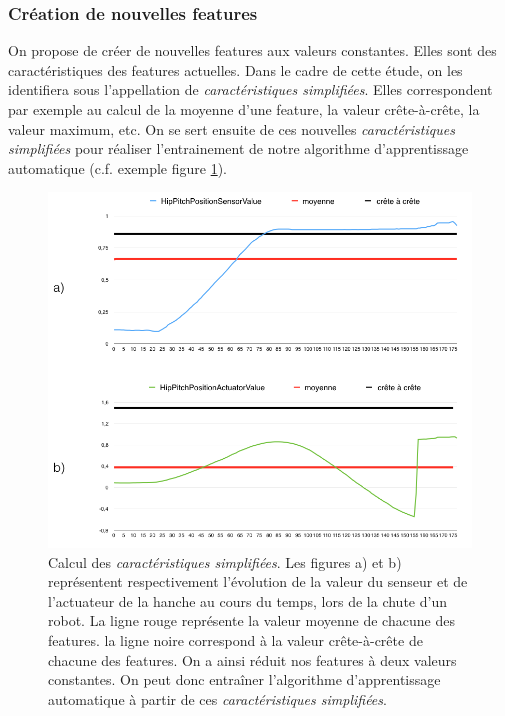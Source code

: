 \subsubsection{Création de nouvelles features}
\label{Automatisation du processus d'investigation: Reconnaissance de motifs: Différentes approches étudiées: Création de nouvelles features}
On propose de créer de nouvelles features aux valeurs constantes. Elles sont des caractéristiques des features actuelles. Dans le cadre de cette étude, on les identifiera sous l'appellation de \emph{caractéristiques simplifiées}. Elles correspondent par exemple au calcul de la moyenne d'une feature, la valeur crête-à-crête, la valeur maximum, etc. On se sert ensuite de ces nouvelles \emph{caractéristiques simplifiées} pour réaliser l'entrainement de notre algorithme d'apprentissage automatique (c.f. exemple figure \ref{fig:Calcul de nouvelles features}).

\begin{figure}[h]
	\centering\includegraphics[width=12cm]{images/caracteristiques_simples_1.png}
	\caption[Calcul des caractéristiques simplifiées]{Calcul des \emph{caractéristiques simplifiées}. Les figures a) et b) représentent respectivement l'évolution de la valeur du senseur et de l'actuateur de la hanche au cours du temps, lors de la chute d'un robot. La ligne rouge représente la valeur moyenne de chacune des features. la ligne noire correspond à la valeur crête-à-crête de chacune des features. On a ainsi réduit nos features à deux valeurs constantes. On peut donc entraîner l'algorithme d'apprentissage automatique à partir de ces \emph{caractéristiques simplifiées}.}
	\label{fig:Calcul de nouvelles features}
\end{figure}


